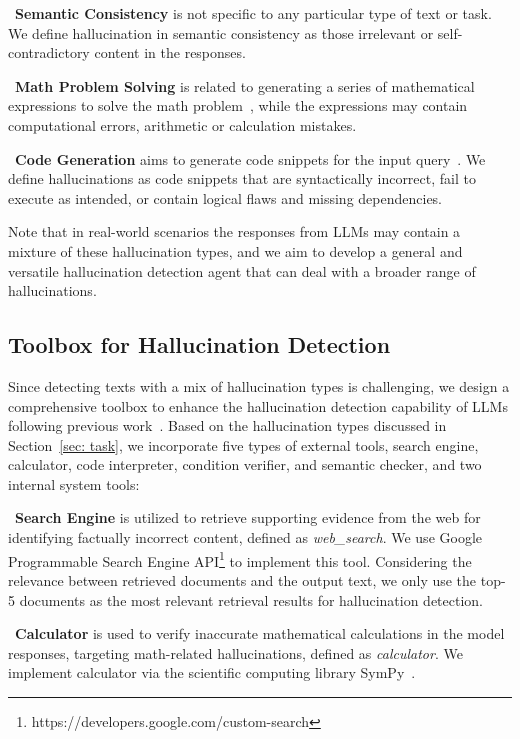 \textbullet~\textbf{Semantic Consistency} is not specific to any particular type of text or task. We define hallucination in semantic consistency as those irrelevant or self-contradictory content in the responses.

\textbullet~\textbf{Math Problem Solving} is related to generating a series of mathematical expressions to solve the math problem~\cite{hendrycks2021measuring}, while the expressions may contain computational errors, \eg arithmetic or calculation mistakes.

\textbullet~\textbf{Code Generation} aims to generate code snippets for the input query~\cite{chen2021evaluating}. We define hallucinations as code snippets that are syntactically incorrect, fail to execute as intended, or contain logical flaws and missing dependencies.

Note that in real-world scenarios the responses from LLMs may contain a mixture of these hallucination types, and we aim to develop a general and versatile hallucination detection agent that can deal with a broader range of hallucinations.



\subsection{Toolbox for Hallucination Detection}
Since detecting texts with a mix of hallucination types is challenging, we design a comprehensive toolbox to enhance the hallucination detection capability of LLMs following previous work~\cite{chern2023factool,gou2024critic}. Based on the hallucination types discussed in Section~\ref{sec: task}, we incorporate five types of external tools, \ie search engine, calculator, code interpreter, condition verifier, and semantic checker, and two internal system tools: 

\textbullet~\textbf{Search Engine} is utilized to retrieve supporting evidence from the web for identifying factually incorrect content, defined as \emph{web\_search}.
We use Google Programmable Search Engine API\footnote{https://developers.google.com/custom-search} to implement this tool.
Considering the relevance between retrieved documents and the output text, we only use the top-5 documents as the most relevant retrieval results for hallucination detection.

\textbullet~\textbf{Calculator} is used to verify inaccurate mathematical calculations in the model responses, targeting math-related hallucinations, defined as \emph{calculator}.
We implement calculator via the scientific computing library SymPy~\cite{10.7717/peerj-cs.103}.

